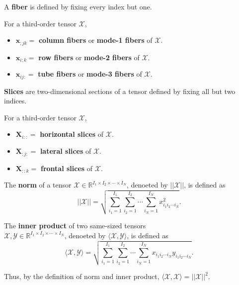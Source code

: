 \documentclass[final]{elsarticle}
\begin{document}
\begin{defn}
    A \textbf{fiber} is defined by fixing every index but one.
\end{defn}
For a third-order tensor $\boldsymbol{\mathscr{X}}$,
\begin{itemize}
    \item $\mathbf{x}_{:jk}=$ \textbf{column fibers} or \textbf{mode-1 fibers}  of $\boldsymbol{\mathscr{X}}$.
    \item $\mathbf{x}_{i:k}=$ \textbf{row fibers} or \textbf{mode-2 fibers}  of $\boldsymbol{\mathscr{X}}$.
    \item $\mathbf{x}_{ij:}=$ \textbf{tube fibers} or \textbf{mode-3 fibers}  of $\boldsymbol{\mathscr{X}}$.
\end{itemize}
\begin{defn}
    \textbf{Slices} are two-dimensional sections of a tensor defined by fixing all but two indices.
\end{defn}
For a third-order tensor $\boldsymbol{\mathscr{X}}$,
\begin{itemize}
    \item $\mathbf{X}_{i::}=$ \textbf{horizontal slices} of $\boldsymbol{\mathscr{X}}$.
    \item $\mathbf{X}_{:j:}=$ \textbf{lateral slices} of $\boldsymbol{\mathscr{X}}$.
    \item $\mathbf{X}_{::k}=$ \textbf{frontal slices} of $\boldsymbol{\mathscr{X}}$.
\end{itemize}
\begin{defn}
    The \textbf{norm} of a tensor $\boldsymbol{\mathscr{X}}\in\mathbb{R}^{I_1\times I_2\times\cdots\times I_N}$,
    denoeted by $||\boldsymbol{\mathscr{X}}||$, is defined as
    \begin{equation}
        ||\boldsymbol{\mathscr{X}}||=\sqrt{\sum_{i_1=1}^{I_1}\sum_{i_2=1}^{I_2}\cdots\sum_{i_N=1}^{I_N}x_{i_1i_2\cdots i_N}^2}.
    \end{equation}
\end{defn}
\begin{defn}
    The \textbf{inner product} of two same-sized tensors\\
    $\boldsymbol{\mathscr{X}},\boldsymbol{\mathscr{Y}}\in\mathbb{R}^{I_1\times I_2\times\cdots\times I_N}$,
    denoeted by $\langle\boldsymbol{\mathscr{X}},\boldsymbol{\mathscr{Y}}\rangle$, is defined as
    \begin{equation}
        \langle\boldsymbol{\mathscr{X}},\boldsymbol{\mathscr{Y}}\rangle=\sqrt{\sum_{i_1=1}^{I_1}\sum_{i_2=1}^{I_2}\cdots\sum_{i_N=1}^{I_N}x_{i_1i_2\cdots i_N}y_{i_1i_2\cdots i_N}}.
    \end{equation}
\end{defn}
Thus, by the definition of norm and inner product,
$\langle\boldsymbol{\mathscr{X}},\boldsymbol{\mathscr{X}}\rangle=||\boldsymbol{\mathscr{X}}||^2$.
\end{document}
